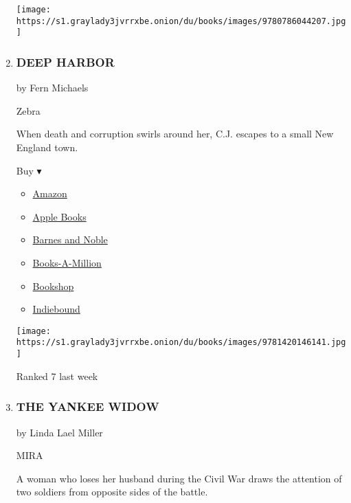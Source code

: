 \begin{enumerate}
  \texttt{[image: https://s1.graylady3jvrrxbe.onion/du/books/images/9780786044207.jpg]}
\item
  \hypertarget{deep-harbor}{%
  \subsubsection{DEEP HARBOR}\label{deep-harbor}}

  by Fern Michaels

  Zebra

  When death and corruption swirls around her, C.J. escapes to a small
  New England town.

  Buy ▾

  \begin{itemize}
  \tightlist
  \item
    \href{https://www.amazon.com/dp/1420146149?tag=NYTBSREV-20\&tag=NYTBS-20}{Amazon}
  \item
    \href{https://du-gae-books-dot-nyt-du-prd.appspot.com/buy?title=DEEP+HARBOR\&author=Fern+Michaels}{Apple
    Books}
  \item
    \href{https://www.anrdoezrs.net/click-7990613-11819508?url=https\%3A\%2F\%2Fwww.barnesandnoble.com\%2Fw\%2F\%3Fean\%3D9781420146141}{Barnes
    and Noble}
  \item
    \href{https://www.anrdoezrs.net/click-7990613-35140?url=https\%3A\%2F\%2Fwww.booksamillion.com\%2Fp\%2FDEEP\%2BHARBOR\%2FFern\%2BMichaels\%2F9781420146141}{Books-A-Million}
  \item
    \href{https://bookshop.org/a/3546/9781420146141}{Bookshop}
  \item
    \href{https://www.indiebound.org/book/9781420146141?aff=NYT}{Indiebound}
  \end{itemize}

  \texttt{[image: https://s1.graylady3jvrrxbe.onion/du/books/images/9781420146141.jpg]}

  Ranked 7 last week
\item
  \hypertarget{the-yankee-widow}{%
  \subsubsection{THE YANKEE WIDOW}\label{the-yankee-widow}}

  by Linda Lael Miller

  MIRA

  A woman who loses her husband during the Civil War draws the attention
  of two soldiers from opposite sides of the battle.


\end{enumerate}
